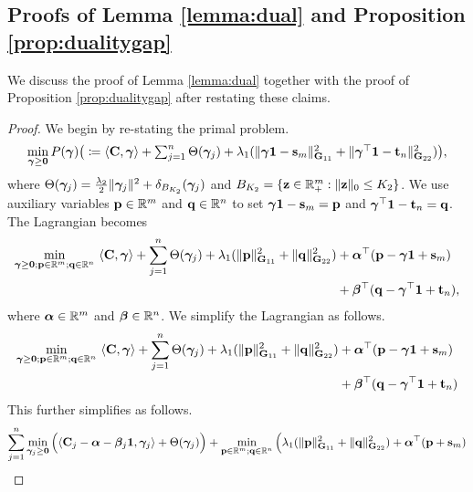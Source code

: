 \subsection[Deriving the Dual of our Column-wise Sparse OT Problem]{Proofs of Lemma \ref{lemma:dual} and Proposition \ref{prop:dualitygap}}\label{app:dual}
We discuss the proof of Lemma \ref{lemma:dual} together with the proof of Proposition \ref{prop:dualitygap} after restating these claims.
\lemmadual*
\propdualitygap*
\begin{proof}
We begin by re-stating the primal problem.
\begin{equation}
    \begin{array}{l}
        \min\limits_{\bm{\gamma}\geq \mathbf{0}} P(\bm{\gamma})\big(\coloneqq \langle\mathbf{C},\bm{\gamma}\rangle + \sum_{j=1}^n \Theta(\bm{\gamma}_j)
        + \lambda_1(\|\bm{\gamma}\mathbf{1}-\mathbf{s}_m\|_{\mathbf{G}_{11}}^2+\|\bm{\gamma}^\top\mathbf{1}-\mathbf{t}_n\|_{\mathbf{G}_{22}}^2)\big),\label{app:primal}
    \end{array}
\end{equation}
where $\Theta(\bm{\gamma}_j)=\frac{\lambda_2}{2}\|\bm{\gamma}_j\|^2 + \delta_{B_{K_2}}(\bm{\gamma}_j)$ and $B_{K_2} = \{\mathbf{z}\in \mathbb{R}_{+}^m:\|\mathbf{z}\|_0\leq K_2\}$.
We use auxiliary variables $\mathbf{p}\in\mathbb{R}^m$ and $\mathbf{q}\in\mathbb{R}^n$ to set $\bm{\gamma}\mathbf{1}-\mathbf{s}_m=\mathbf{p}$ and $\bm{\gamma}^\top\mathbf{1}-\mathbf{t}_n=\mathbf{q}$. The Lagrangian becomes
\begin{align*}
    \min\limits_{\bm{\gamma}\geq \mathbf{0}; \mathbf{p}\in \mathbb{R}^m; \mathbf{q} \in \mathbb{R}^n} \ \langle\mathbf{C},\bm{\gamma}\rangle + \sum_{j=1}^n \Theta(\bm{\gamma}_j) + \lambda_1(\|\mathbf{p}\|_{\mathbf{G}_{11}}^2+\|\mathbf{q}\|_{\mathbf{G}_{22}}^2) &+ \bm{\alpha}^\top(\mathbf{p}-\bm{\gamma} \mathbf{1} + \mathbf{s}_m) \\
    &+ \bm{\beta}^\top(\mathbf{q}-\bm{\gamma}^\top \mathbf{1} + \mathbf{t}_n),
\end{align*}
where $\bm{\alpha}\in \mathbb{R}^m$ and $\bm{\beta} \in \mathbb{R}^n$. We simplify the Lagrangian as follows.
\begin{align*}
    \min\limits_{\bm{\gamma}\geq \mathbf{0}; \mathbf{p}\in \mathbb{R}^m; \mathbf{q} \in \mathbb{R}^n} \ \langle\mathbf{C},\bm{\gamma}\rangle + \sum_{j=1}^n \Theta(\bm{\gamma}_j) + \lambda_1(\|\mathbf{p}\|_{\mathbf{G}_{11}}^2+\|\mathbf{q}\|_{\mathbf{G}_{22}}^2) &  +  \bm{\alpha}^\top(\mathbf{p}-\bm{\gamma} \mathbf{1} + \mathbf{s}_m) 
    \\ & + \bm{\beta}^\top(\mathbf{q}-\bm{\gamma}^\top \mathbf{1} + \mathbf{t}_n)
\end{align*}
This further simplifies as follows.
\begin{align*}
    \sum_{j=1}^n \min\limits_{\bgamma_j\geq \bzero} \Big(\langle\mathbf{C}_j-\balpha -\bbeta_j\bone , \bgamma_j\rangle +  \Theta(\bgamma_j) \Big) + \min\limits_{\mathbf{p}\in \R^m; \mathbf{q} \in \R^n}\Big( \lambda_1(\|\mathbf{p}\|_{\bG_{11}}^2+\|\mathbf{q}\|_{\bG_{22}}^2) & + \balpha^\top(\mathbf{p} + \bmu) \\ 

\end{align*}
\end{proof}
